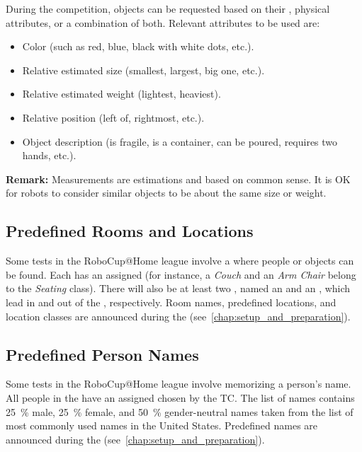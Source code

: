 During the competition, objects can be requested based on their \ObjectCategory, physical attributes, or a combination of both.
Relevant attributes to be used are:
\begin{itemize}
	\item Color (such as red, blue, black with white dots, etc.).
	\item Relative estimated size (smallest, largest, big one, etc.).
	\item Relative estimated weight (lightest, heaviest).
	\item Relative position (left of, rightmost, etc.).
	\item Object description (is fragile, is a container, can be poured, requires two hands, etc.).
\end{itemize}

\noindent\textbf{Remark:} Measurements are estimations and based on common sense. It is OK for robots to consider similar objects to be about the same size or weight.

%
%

\subsection{Predefined Rooms and Locations}
\label{rule:scenario_locations}

Some tests in the RoboCup@Home league involve a \PredefinedLocation{} where people or objects can be found.
Each \PredefinedLocation{} has an assigned \LocationClass{} (for instance, a \textit{Couch} and an \textit{Arm Chair} belong to the \textit{Seating} class).
There will also be at least two , named an \Entrance{} and an \Exit, which lead in and out of the \Arena{}, respectively.
Room names, predefined locations, and location classes are announced during the \SetupDays{} (see~\ref{chap:setup_and_preparation}).

\subsection{Predefined Person Names}
\label{rule:scenario_names}

Some tests in the RoboCup@Home league involve memorizing a person's name.
All people in the \Arena{} have an assigned \PredefinedName{} chosen by the TC.
The list of names contains \SI{25}{\percent} male, \SI{25}{\percent} female, and \SI{50}{\percent} gender-neutral names taken from the list of most commonly used names in the United States.
Predefined names are announced during the \SetupDays{} (see~\ref{chap:setup_and_preparation}).

